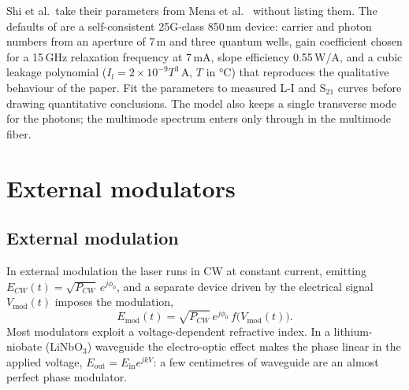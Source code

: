 \begin{pitfall}
Shi et al.\ take their parameters from Mena et al.~\cite{mena1999} without listing them. The
defaults of  are a self-consistent 25G-class 850\,nm device: carrier and photon numbers
from an aperture of 7\,\textmu m and three quantum wells, gain coefficient chosen for a 15\,GHz relaxation
frequency at 7\,mA, slope efficiency 0.55\,W/A, and a cubic leakage polynomial
($I_l=2\times10^{-9}T^3$\,A, $T$ in °C) that reproduces the qualitative behaviour of the paper. Fit
the parameters to measured L-I and S$_{21}$ curves before drawing quantitative conclusions. The model
also keeps a single transverse mode for the photons; the multimode spectrum enters only through
 in the multimode fiber.
\end{pitfall}

\section{External modulators}\label{sec:modulators}
\subsection{External modulation}
In external modulation the laser runs in CW at constant current, emitting
$E_{CW}(t)=\sqrt{P_{CW}}\,e^{j\phi_0}$, and a separate device driven by the electrical signal $V_{\mathrm{mod}}(t)$
imposes the modulation,
\begin{equation}
  E_{\mathrm{mod}}(t)=\sqrt{P_{CW}}\,e^{j\phi_0}\,f\big(V_{\mathrm{mod}}(t)\big).
\end{equation}
Most modulators exploit a voltage-dependent refractive index. In a lithium-niobate (LiNbO$_3$)
waveguide the electro-optic effect makes the phase linear in the applied voltage,
$E_{\mathrm{out}}=E_{\mathrm{in}}e^{jkV}$: a few centimetres of waveguide are an almost perfect phase modulator.

